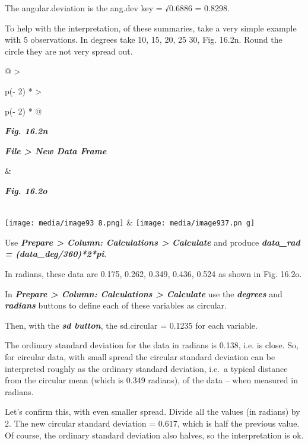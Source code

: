 \documentclass[
  letterpaper,
  DIV=11,
  numbers=noendperiod]{scrreprt}
\begin{document}
The angular.deviation is the ang.dev key = √0.6886 = 0.8298.

To help with the interpretation, of these summaries, take a very simple
example with 5 observations. In degrees take 10, 15, 20, 25 30, Fig.
16.2n. Round the circle they are not very spread out.

\begin{longtable}[]{@{}
  >{\raggedright\arraybackslash}p{(\columnwidth - 2\tabcolsep) * }
  >{\raggedright\arraybackslash}p{(\columnwidth - 2\tabcolsep) * }@{}}
\toprule\noalign{}
\begin{minipage}[b]{\linewidth}\raggedright
\textbf{\emph{Fig. 16.2n}}

\textbf{\emph{File \textgreater{} New Data Frame}}
\end{minipage} & \begin{minipage}[b]{\linewidth}\raggedright
\textbf{\emph{Fig. 16.2o}}
\end{minipage} \\
\midrule\noalign{}
\endhead
\bottomrule\noalign{}
\endlastfoot
\texttt{[image: media/image93 8.png]}
&
\texttt{[image: media/image937.pn g]} \\
\end{longtable}

Use \textbf{\emph{Prepare \textgreater{} Column: Calculations
\textgreater{} Calculate}} and produce \textbf{\emph{data\_rad =
(data\_deg/360)*2*pi}}.

In radians, these data are 0.175, 0.262, 0.349, 0.436, 0.524 as shown in
Fig. 16.2o.

In \textbf{\emph{Prepare \textgreater{} Column: Calculations
\textgreater{} Calculate}} use the \textbf{\emph{degrees}} and
\textbf{\emph{radians}} buttons to define each of these variables as
circular.

Then, with the \textbf{\emph{sd button}}, the sd.circular = 0.1235 for
each variable.

The ordinary standard deviation for the data in radians is 0.138, i.e.
is close. So, for circular data, with small spread the circular standard
deviation can be interpreted roughly as the ordinary standard deviation,
i.e.~a typical distance from the circular mean (which is 0.349 radians),
of the data -- when measured in radians.

Let's confirm this, with even smaller spread. Divide all the values (in
radians) by 2. The new circular standard deviation = 0.617, which is
half the previous value. Of course, the ordinary standard deviation also
halves, so the interpretation is ok.
\end{document}
